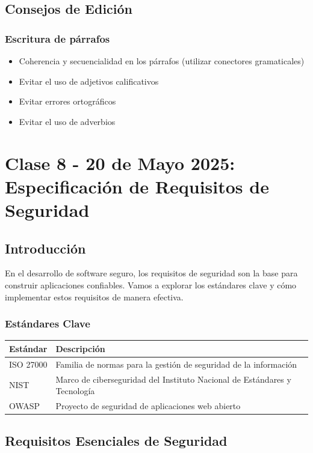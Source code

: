 \documentclass[12pt,a4paper]{article}
\begin{document}
\subsection{Consejos de Edición}
\subsubsection{Escritura de párrafos}
\begin{itemize}
    \item Coherencia y secuencialidad en los párrafos (utilizar conectores gramaticales)
    \item Evitar el uso de adjetivos calificativos
    \item Evitar errores ortográficos
    \item Evitar el uso de adverbios
\end{itemize}

\section{Clase 8 - 20 de Mayo 2025: Especificación de Requisitos de Seguridad}
\subsection{Introducción}
En el desarrollo de software seguro, los requisitos de seguridad son la base para construir aplicaciones confiables. Vamos a explorar los estándares clave y cómo implementar estos requisitos de manera efectiva.

\subsubsection{Estándares Clave}
\begin{center}
\begin{tabular}{|l|p{10cm}|}
\hline
\textbf{Estándar} & \textbf{Descripción} \\ \hline
ISO 27000 & Familia de normas para la gestión de seguridad de la información \\
NIST & Marco de ciberseguridad del Instituto Nacional de Estándares y Tecnología \\
OWASP & Proyecto de seguridad de aplicaciones web abierto \\ \hline
\end{tabular}
\end{center}

\subsection{Requisitos Esenciales de Seguridad}
\end{document}
